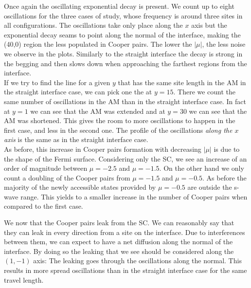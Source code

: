 \documentclass[..\main.tex]{subfile}
\begin{document}
Once again the oscillating exponential decay is present. We count up to eight oscillations for the three cases of study, whose
frequency is around three sites in all configurations. The oscillations take only place along the $x$ axis but the exponential decay
seams to point along the normal of the interface, making the (40,0) region the less populated in Cooper pairs.
The lower the $|\mu|$, the less noise we observe in the plots. Similarly to the straight interface the decay is strong in the begging
and then slows down when approaching the farthest regions from the interface.\\

If we try to find the line for a given $y$ that has the same site length in the AM in the straight interface case, we can pick one the at $y=15$.
There we count the same number of oscillations in the AM than in the straight interface case. In fact at $y=1$ we can see that the AM was
extended and at $y=30$ we can see that the AM was shortened. This gives the room to more oscillations to happen in the first case,
and less in the second one. The profile of the oscillations \textit{along the $x$ axis} is the same as in the straight interface case. \\

As before, this increase in Cooper pairs formation with decreasing $|\mu|$ is due to the shape of the Fermi surface.
Considering only the SC, we see an increase of an order of magnitude between $\mu=-2.5$ and $\mu=-1.5$. On the other hand we only count
a doubling of the Cooper pairs from $\mu=-1.5$ and $\mu=-0.5$.
As before the majority of the newly accessible states provided by $\mu=-0.5$ are outside the s-wave range.
This yields to a smaller increase in the number of Cooper pairs when compared to the first case.


We now that the Cooper pairs leak from the SC. We can reasonably say that they can leak in every direction from a site on the interface.
Due to interferences between them, we can expect to have a net diffusion along the normal of the interface. By doing so the leaking that we see
should be considered along the $(1,-1)$ axis: The leaking goes through the oscillations along the normal. This results in more spread
oscillations than in the straight interface case for the same travel length.
\end{document}
